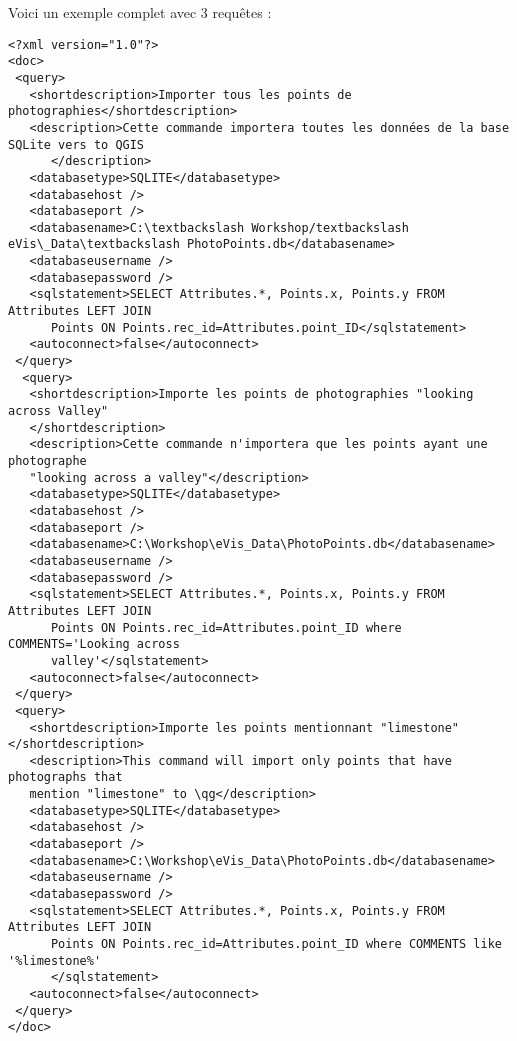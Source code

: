 Voici un exemple complet avec 3 requêtes :
{\small
\begin{verbatim}
<?xml version="1.0"?>
<doc>
 <query>
   <shortdescription>Importer tous les points de photographies</shortdescription>
   <description>Cette commande importera toutes les données de la base SQLite vers to QGIS
      </description>
   <databasetype>SQLITE</databasetype>
   <databasehost />
   <databaseport />
   <databasename>C:\textbackslash Workshop/textbackslash
eVis\_Data\textbackslash PhotoPoints.db</databasename>
   <databaseusername />
   <databasepassword />
   <sqlstatement>SELECT Attributes.*, Points.x, Points.y FROM Attributes LEFT JOIN 
      Points ON Points.rec_id=Attributes.point_ID</sqlstatement>
   <autoconnect>false</autoconnect>
 </query>
  <query>
   <shortdescription>Importe les points de photographies "looking across Valley"
   </shortdescription>
   <description>Cette commande n'importera que les points ayant une photographe 
   "looking across a valley"</description>
   <databasetype>SQLITE</databasetype>
   <databasehost />
   <databaseport />
   <databasename>C:\Workshop\eVis_Data\PhotoPoints.db</databasename>
   <databaseusername />
   <databasepassword />
   <sqlstatement>SELECT Attributes.*, Points.x, Points.y FROM Attributes LEFT JOIN 
      Points ON Points.rec_id=Attributes.point_ID where COMMENTS='Looking across 
      valley'</sqlstatement>
   <autoconnect>false</autoconnect>
 </query>
 <query>
   <shortdescription>Importe les points mentionnant "limestone"</shortdescription>
   <description>This command will import only points that have photographs that
   mention "limestone" to \qg</description>
   <databasetype>SQLITE</databasetype>
   <databasehost />
   <databaseport />
   <databasename>C:\Workshop\eVis_Data\PhotoPoints.db</databasename>
   <databaseusername />
   <databasepassword />
   <sqlstatement>SELECT Attributes.*, Points.x, Points.y FROM Attributes LEFT JOIN 
      Points ON Points.rec_id=Attributes.point_ID where COMMENTS like '%limestone%'
      </sqlstatement>
   <autoconnect>false</autoconnect>
 </query>
</doc>
\end{verbatim}}